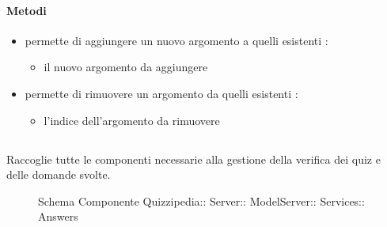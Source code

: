 \paragraph{Metodi}
\begin{itemize}
\item {}
\newline
permette di aggiungere un nuovo argomento a quelli esistenti
\newline
{} :
\begin{itemize}
\item {}
\newline
il nuovo argomento da aggiungere
\end{itemize}
\item {}
\newline
permette di rimuovere un argomento da quelli esistenti
\newline
{} :
\begin{itemize}
\item {}
\newline
l'indice dell'argomento da rimuovere
\end{itemize}
\end{itemize}
\subsection{}
Raccoglie tutte le componenti necessarie alla gestione della verifica dei quiz e delle domande svolte.
\begin{figure}[H]
\centering
\noindent{}
\caption[Schema Componente Quizzipedia::Server::ModelServer::Services::Answers]{Schema Componente Quizzipedia:: Server:: ModelServer:: Services:: Answers}
\end{figure}
